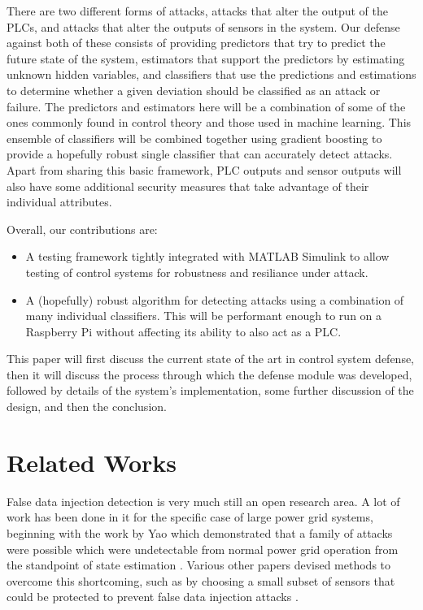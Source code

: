 \documentclass[10pt,twocolumn]{IEEEtran}
\begin{document}
There are two different forms of attacks, attacks that alter the output of the PLCs, and attacks that alter the outputs of sensors in the system.
Our defense against both of these consists of providing predictors that try to predict the future state of the system, estimators that support the predictors by estimating unknown hidden variables, and classifiers that use the predictions and estimations to determine whether a given deviation should be classified as an attack or failure.
The predictors and estimators here will be a combination of some of the ones commonly found in control theory and those used in machine learning.
This ensemble of classifiers will be combined together using gradient boosting to provide a hopefully robust single classifier that can accurately detect attacks.
Apart from sharing this basic framework, PLC outputs and sensor outputs will also have some additional security measures that take advantage of their individual attributes.

Overall, our contributions are:
\begin{itemize}
\item A testing framework tightly integrated with MATLAB Simulink to allow testing of control systems for robustness and resiliance under attack.
\item A (hopefully) robust algorithm for detecting attacks using a combination of many individual classifiers.
  This will be performant enough to run on a Raspberry Pi without affecting its ability to also act as a PLC.
\end{itemize}

This paper will first discuss the current state of the art in control system defense, then it will discuss the process through which the defense module was developed, followed by details of the system's implementation, some further discussion of the design, and then the conclusion.

\section{Related Works} \label{sec:related}
False data injection detection is very much still an open research area.
A lot of work has been done in it for the specific case of large power grid systems, beginning with the work by Yao which demonstrated that a family of attacks were possible which were undetectable from normal power grid operation from the standpoint of state estimation \cite{liu2011false}.
Various other papers devised methods to overcome this shortcoming, such as by choosing a small subset of sensors that could be protected to prevent false data injection attacks \cite{bobba2010detecting}.
\end{document}
